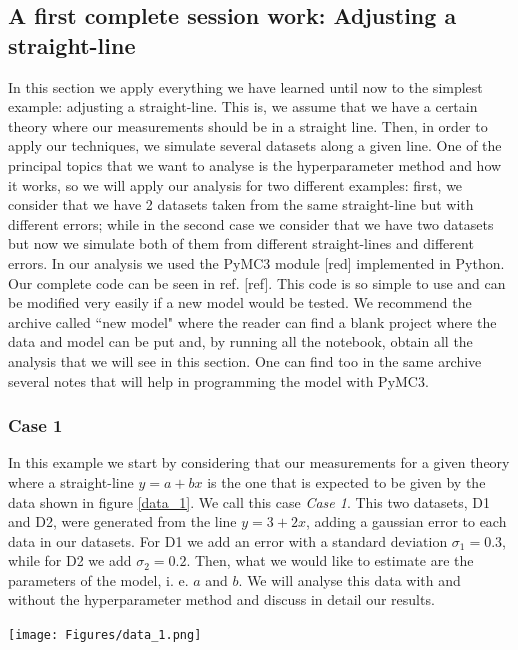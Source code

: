 \documentclass[onecolumn,           %
               showpacs,            %
               preprintnumbers,     %
               aps,                 %
               prl,          	    %
               letterpaper,             %
               superscriptaddress,      %
               nofootinbib,         %
               tightenlines,        %
               floats,floatfix      %
               ,usenatbib,
               ]{revtex4-1}
\begin{document}
 \subsection{A first complete session work: Adjusting a straight-line}

In this section we apply everything we have learned until now to the simplest example: adjusting a straight-line. This is, we assume that we have a certain theory where our measurements should be in a straight line. Then, in order to apply our techniques, we simulate several datasets along a given line. One of the principal topics that we want to analyse is the hyperparameter method and how it works, so we will apply our analysis for two different examples: first, we consider that we have 2 datasets taken from the same straight-line but with different errors; while in the second case we consider that we have two datasets but now we simulate both of them from different straight-lines and different errors. In our analysis we used the PyMC3 module [red] implemented in Python. Our complete code can be seen in ref. [ref]. This code is so simple to use and can be modified very easily if a new model would be tested. We recommend the archive called ``new model" where the reader can find a blank project where the data and model can be put and, by running all the notebook, obtain all the analysis that we will see in this section. One can find too in the same archive several notes that will help in programming the model with PyMC3. 

\subsubsection{Case 1}

In this example we start by considering that our measurements for a given theory where a straight-line $y=a+bx$ is the one that is expected to be given by the data shown in figure \ref{data_1}. We call this case \textit{Case 1}. This two datasets, D1 and D2, were generated from the line $y=3+2x$, adding a gaussian error to each data in our datasets. For D1 we add an error with a standard deviation $\sigma_1 = 0.3$, while for D2 we add $\sigma_2 = 0.2$. Then, what we would like to estimate are the parameters of the model, i. e. $a$ and $b$. We will analyse this data with and without the hyperparameter method and discuss in detail our results.

\begin{minipage}{\textwidth}
\centering
\texttt{[image: Figures/data\_1.png]}
\label{data_1}
\end{minipage}
\end{document}
